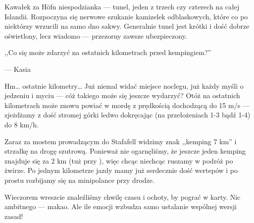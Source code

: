 Kawałek za Höfn niespodzianka --- tunel, jeden z trzech czy czterech na całej Islandii. Rozpoczyna się nerwowe szukanie kamizelek odblaskowych, które co po niektórzy wrzucili na samo dno sakwy. Generalnie tunel jest krótki i dość dobrze oświetlony, lecz wiadomo --- przezorny zawsze ubezpieczony.

\epigraph{,,Co się może zdarzyć na ostatnich kilometrach przed kempingiem?''}{--- \textup{Kasia}}

Hm… ostatnie kilometry… Już niemal widać miejsce noclegu, już każdy myśli o jedzeniu i myciu --- cóż takiego może się jeszcze wydarzyć? Otóż na ostatnich kilometrach może znowu powiać w mordę z prędkością dochodzącą do 15 m/s --- zjeżdżamy z dość stromej górki ledwo dokręcając (na przełożeniach 1-3 bądź 1-4) do 8 km/h.

Zaraz za mostem prowadzącym do Stafafell widzimy znak ,,kemping 7 km'' i strzałkę na drogę szutrową. Ponieważ nie ogarnęliśmy, że jeszcze jeden kemping znajduje się za 2 km (tuż przy ), więc chcąc niechcąc ruszamy w podróż po żwirze. Po jednym kilometrze jazdy mamy już serdecznie dość wertepów i po prostu rozbijamy się na minipolance przy drodze.

Wieczorem wreszcie znaleźliśmy chwilę czasu i ochoty, by pograć w karty. Nic ambitnego --- makao. Ale ile emocji wzbudza samo ustalanie wspólnej wersji zasad!

